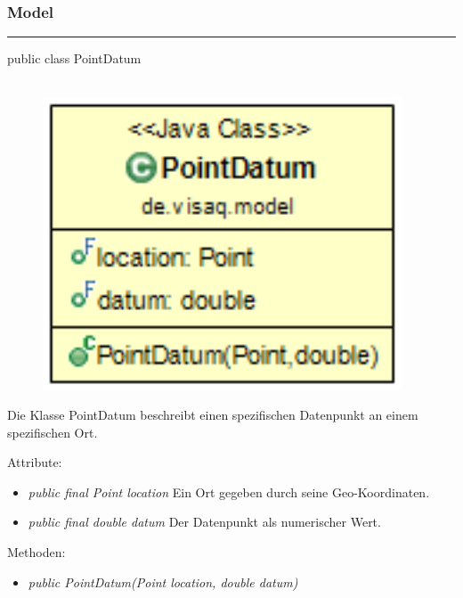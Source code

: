 \subsubsection{Model}


\clearpage %
\rule{\textwidth}{0.4pt}
public class PointDatum
\\\\
\begin{minipage}{0.25\textwidth}
    \begin{figure}[H]
        {\centering\includegraphics[width=0.95\textwidth]{media/backend/modell/classes/PointDatum.png}}
    \end{figure}
    \end{minipage} \hfill
\begin{minipage}{0.75\textwidth}
    Die Klasse PointDatum beschreibt einen spezifischen Datenpunkt an einem spezifischen Ort.
\end{minipage}

Attribute:
\begin{itemize}
    \item \emph{public final Point location} Ein Ort gegeben durch seine Geo-Koordinaten.
    \item \emph{public final double datum} Der Datenpunkt als numerischer Wert.
\end{itemize}
Methoden:
\begin{itemize}
    \item \emph{public PointDatum(Point location, double datum)}
\end{itemize}

